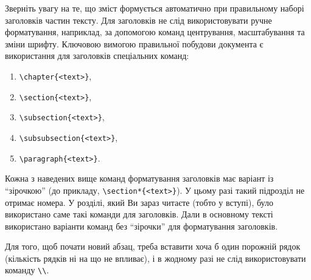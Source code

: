 Зверніть увагу на те, що зміст формується автоматично при правильному наборі заголовків частин тексту. Для заголовків не слід використовувати ручне форматування, наприклад, за допомогою команд центрування, масштабування та зміни шрифту. Ключовою вимогою правильної побудови документа є використання для заголовків спеціальних команд:
\begin{enumerate}[label={\upshape\arabic*)}, leftmargin=3.5ex, labelwidth=3.5ex]
\item	
{\color{bluegreen}\verb|\chapter{<text>}|}, 
\item
{\color{bluegreen}\verb|\section{<text>}|}, 
\item
{\color{bluegreen}\verb|\subsection{<text>}|}, 
\item
{\color{bluegreen}\verb|\subsubsection{<text>}|}, 
\item
{\color{bluegreen}\verb|\paragraph{<text>}|}.
\end{enumerate}
Кожна з наведених вище команд форматування заголовків має варіант із ``зірочкою'' (до прикладу, {\color{bluegreen}\verb|\section*{<text>}|}). У цьому разі такий підрозділ не отримає номера. У розділі, який Ви зараз читаєте  (тобто у вступі), було використано саме такі команди для заголовків. Дали в основному тексті використано варіанти команд без ``зірочки'' для форматування заголовків.

Для того,  щоб почати новий абзац, треба вставити хоча б один порожній рядок (кількість рядків ні на що не впливає), і в жодному разі не слід використовувати команду  {\color{bluegreen}\verb|\\|}. 

